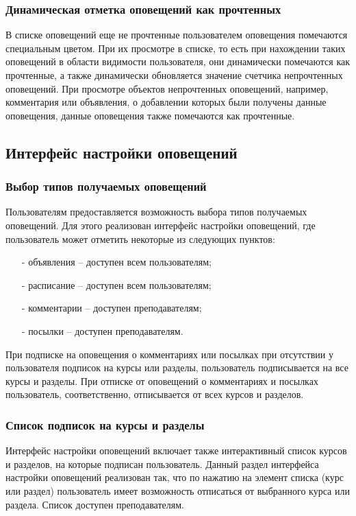 \documentclass[12pt, a4paper, oneside]{article}
\begin{document}
\subsubsection{Динамическая отметка оповещений как прочтенных}
В списке оповещений еще не прочтенные пользователем оповещения помечаются специальным цветом. При их просмотре в списке, то есть при нахождении таких оповещений в области видимости пользователя, они динамически помечаются как прочтенные, а также динамически обновляется значение счетчика непрочтенных оповещений. При просмотре объектов непрочтенных оповещений, например, комментария или объявления, о добавлении которых были получены данные оповещения, данные оповещения также помечаются как прочтенные.
\subsection{Интерфейс настройки оповещений}
\subsubsection{Выбор типов получаемых оповещений}
Пользователям предоставляется возможность выбора типов получаемых оповещений. Для этого реализован интерфейс настройки оповещений, где пользователь может отметить некоторые из следующих пунктов:
\begin{itemize}
    \item [-] объявления – доступен всем пользователям;
    \item [-] расписание – доступен всем пользователям;
    \item [-] комментарии – доступен преподавателям;
    \item [-] посылки – доступен преподавателям.
\end{itemize}

При подписке на оповещения о комментариях или посылках при отсутствии у пользователя подписок на курсы или разделы, пользователь подписывается на все курсы и разделы. При отписке от оповещений о комментариях и посылках пользователь, соответственно, отписывается от всех курсов и разделов.
\subsubsection{Список подписок на курсы и разделы}
Интерфейс настройки оповещений включает также интерактивный список курсов и разделов, на которые подписан пользователь. Данный раздел интерфейса настройки оповещений реализован так, что по нажатию на элемент списка (курс или раздел) пользователь имеет возможность отписаться от выбранного курса или раздела. Список доступен преподавателям.
\newpage
\end{document}
